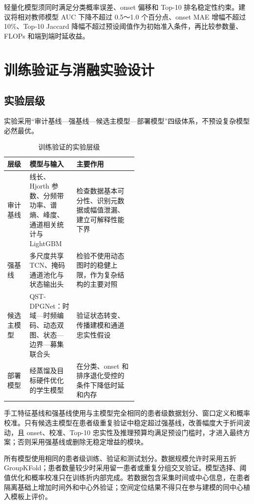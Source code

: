 轻量化模型须同时满足分类概率误差、onset 偏移和 Top-10 排名稳定性约束。建议将相对教师模型 AUC 下降不超过 0.5～1.0 个百分点、onset MAE 增幅不超过 10\%、Top-10 Jaccard 降幅不超过预设阈值作为初始准入条件，再比较参数量、FLOPs 和端到端时延收益。

\clearpage
\section{训练验证与消融实验设计}

\subsection{实验层级}

实验采用“审计基线—强基线—候选主模型—部署模型”四级体系，不预设复杂模型必然最优。

\begin{table}[htbp]
    \centering
    \small
    \caption{训练验证的实验层级}
    \label{tab:experiment-levels}
    \renewcommand{\arraystretch}{1.25}
    \setlength{\tabcolsep}{3pt}
    \begin{tabularx}{\linewidth}{@{}p{0.17\linewidth}p{0.36\linewidth}X@{}}
        \toprule
        \textbf{层级} & \textbf{模型与输入} & \textbf{主要作用} \\
        \midrule
        审计基线 & 线长、Hjorth 参数、分频带功率、谱熵、峰度、通道相关统计与 LightGBM & 检查数据基本可分性、识别元数据或幅值泄漏、建立可解释性能下界 \\
        强基线 & 多尺度共享 TCN、掩码通道池化与状态输出头 & 检验不使用动态图时的稳健上限，作为复杂结构的主要对照 \\
        候选主模型 & QST-DPGNet：时域—时频编码、动态双图、状态—边界—募集联合头 & 验证状态转变、传播建模和通道忠实性假设 \\
        部署模型 & 经蒸馏及目标硬件优化的学生模型 & 在分类、onset 和排序退化受控的条件下降低时延和内存 \\
        \bottomrule
    \end{tabularx}
\end{table}

手工特征基线和强基线使用与主模型完全相同的患者级数据划分、窗口定义和概率校准。只有候选主模型在患者级重复验证中稳定超过强基线，改善幅度大于折间波动，且 onset、校准、Top-10 忠实性及推理预算均满足预设门槛时，才进入最终方案；否则采用强基线或删除无稳定增益的模块。

所有模型使用相同的患者级训练、验证和测试划分。数据规模允许时采用五折 GroupKFold；患者数量较少时采用留一患者或重复分组交叉验证。模型选择、阈值优化和概率校准只在训练折内部完成。若数据包含采集时间或中心信息，在患者隔离基础上增加时间外和中心外验证；空间定位结果不得只在参与建模的同中心植入模板上评价。


